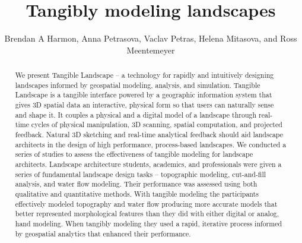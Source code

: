 \documentclass[Afour,sageh,times]{sagej}
\begin{document}
\title{Tangibly modeling landscapes}
\author{Brendan A Harmon, Anna Petrasova, Vaclav Petras, Helena Mitasova, and Ross Meentemeyer}


\begin{abstract}
We present Tangible Landscape 
-- a technology for rapidly and intuitively designing landscapes
informed by geospatial modeling, analysis, and simulation.
%
Tangible Landscape is a tangible interface powered by a geographic information system 
that gives 3D spatial data an interactive, physical form so that 
users can naturally sense and shape it.
%
It couples a physical and a digital model of a landscape
through real-time cycles of 
physical manipulation, 3D scanning, spatial computation, and projected feedback.
% 
Natural 3D sketching and real-time analytical feedback should aid
landscape architects in the design of high performance, process-based landscapes.
%
We conducted a series of studies to assess the effectiveness of 
tangible modeling for landscape architects.
%
Landscape architecture students, academics, and professionals 
were given a series of fundamental landscape design tasks 
-- topographic modeling, cut-and-fill analysis, and water flow modeling. 
%
Their performance was assessed using both qualitative and quantitative methods.
%
With tangible modeling the participants
effectively modeled topography and water flow 
producing more accurate models 
that better represented morphological features 
than they did with either digital or analog, hand modeling.
%
When tangibly modeling
they used a rapid, iterative process informed by geospatial analytics 
that enhanced their performance.  
\end{abstract}

\end{document}
